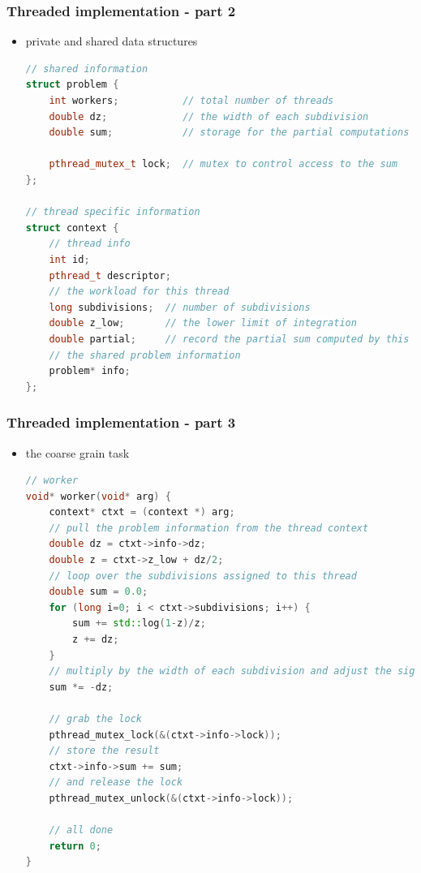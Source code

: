 \begin{frame}[fragile]
%
  \frametitle{Threaded implementation - part 2}
%
  \begin{itemize}
  \item private and shared data structures
  \begin{lstlisting}[language=c++,name=threaded]
// shared information
struct problem {
    int workers;           // total number of threads
    double dz;             // the width of each subdivision
    double sum;            // storage for the partial computations

    pthread_mutex_t lock;  // mutex to control access to the sum
};

// thread specific information
struct context {
    // thread info
    int id;
    pthread_t descriptor;
    // the workload for this thread
    long subdivisions;  // number of subdivisions
    double z_low;       // the lower limit of integration
    double partial;     // record the partial sum computed by this thread
    // the shared problem information
    problem* info;
};
  \end{lstlisting}
%
  \end{itemize}
%
\end{frame}

\begin{frame}[fragile]
%
  \frametitle{Threaded implementation - part 3}
%
  \begin{itemize}
  \item the coarse grain task
  \begin{lstlisting}[language=c++,name=threaded]
// worker
void* worker(void* arg) {
    context* ctxt = (context *) arg;
    // pull the problem information from the thread context
    double dz = ctxt->info->dz;
    double z = ctxt->z_low + dz/2;
    // loop over the subdivisions assigned to this thread
    double sum = 0.0;
    for (long i=0; i < ctxt->subdivisions; i++) {
        sum += std::log(1-z)/z;
        z += dz;
    }
    // multiply by the width of each subdivision and adjust the sign
    sum *= -dz;

    // grab the lock
    pthread_mutex_lock(&(ctxt->info->lock));
    // store the result
    ctxt->info->sum += sum;
    // and release the lock
    pthread_mutex_unlock(&(ctxt->info->lock));

    // all done
    return 0;
}
  \end{lstlisting}
%
  \end{itemize}
%
\end{frame}

